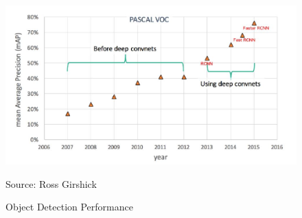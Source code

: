 
\begin{frame}
	\begin{overlayarea}{\textwidth}{\textheight}
		\begin{figure}
			\includegraphics[scale =0.65]{images/object.JPG}
			\caption{Object Detection Performance } \hspace{10cm} Source: Ross Girshick
		\end{figure}
	\end{overlayarea}
\end{frame}
